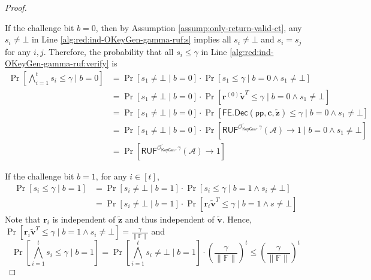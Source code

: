 \begin{proof}
\begin{figure}[h]
\end{figure}


If the challenge bit $b = 0$, then by Assumption \ref{assump:only-return-valid-ct}, any $s_i \neq \bot$ in Line \ref{alg:red:ind-OKeyGen-gamma-ruf:s} implies all $s_i \neq \bot$ and $s_i = s_j$ for any $i, j$. Therefore, the probability that all $s_i \leq \gamma$ in Line \ref{alg:red:ind-OKeyGen-gamma-ruf:verify} is
\begin{align*}
	\Pr\left[ \bigwedge_{i=1}^t s_i \leq \gamma \mid b = 0 \right]
	&= \Pr\left[ s_1 \neq \bot \mid b = 0 \right] \cdot \Pr \left[ s_1 \leq \gamma \mid b = 0 \wedge s_1 \neq \bot \right] \\
	&= \Pr \left[ s_1 \neq \bot \mid b = 0 \right] \cdot \Pr \left[ \mathbf{r}^{(0)} \mathbf{\tilde{v}}^T \leq \gamma \mid b = 0 \wedge s_1 \neq \bot \right] \\
	&= \Pr \left[s_1 \neq \bot \mid b = 0 \right] \cdot \Pr \left[ \textsf{FE.Dec}(\textsf{pp}, \mathbf{c}, \mathbf{\tilde{z}}) \leq \gamma \mid b = 0 \wedge s_1 \neq \bot \right] \\
	&= \Pr \left[s_1 \neq \bot \mid b = 0 \right] \cdot \Pr \left[ \textsf{RUF}^{\mathcal{O}^\prime_{\textsf{KeyGen}}, \gamma}(\mathcal{A}) \to 1 \mid b = 0 \wedge s_1 \neq \bot \right] \\ 
	&= \Pr \left[ \textsf{RUF}^{\mathcal{O}^\prime_{\textsf{KeyGen}}, \gamma}(\mathcal{A}) \to 1 \right] 
\end{align*}

If the challenge bit $b = 1$, for any $i \in [t]$,
\begin{align*}
	\Pr[ s_i \leq \gamma \mid b = 1 ]
	&= \Pr[s_i \neq \bot \mid b = 1] \cdot \Pr[ s_i \leq \gamma \mid b = 1 \wedge s_i \neq \bot] \\
	&= \Pr[s_i \neq \bot \mid b = 1] \cdot \Pr[ \mathbf{r}_i \mathbf{\tilde{v}}^T \leq \gamma \mid b = 1 \wedge s \neq \bot]
\end{align*}
Note that $\mathbf{r}_i$ is independent of $\mathbf{\tilde{z}}$ and thus independent of $\mathbf{\tilde{v}}$. Hence, $\Pr[\mathbf{r}_i \mathbf{\tilde{v}}^T \leq \gamma \mid b = 1 \wedge s_i \neq \bot] = \frac{\gamma}{\| \mathbb{F} \|}$ and
\[
	\Pr \left[ \bigwedge_{i=1}^t s_i \leq \gamma \mid b = 1 \right] = \Pr \left[ \bigwedge_{i=1}^t s_i \neq \bot \mid b = 1 \right] \cdot \left( \frac{\gamma}{\| \mathbb{F} \|} \right)^t \leq \left( \frac{\gamma}{\| \mathbb{F} \|} \right)^t
\]


\end{proof}
